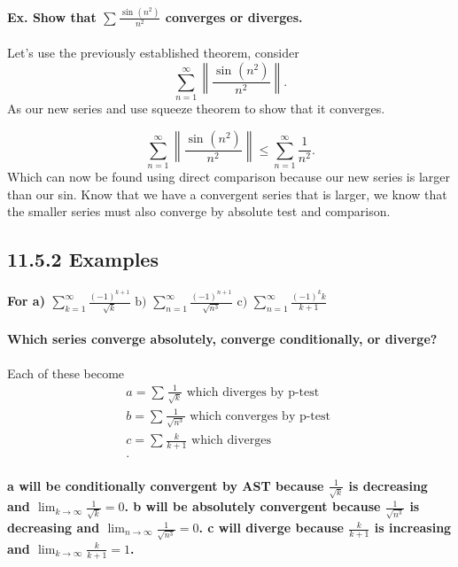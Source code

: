 \documentclass[a4paper]{article}
\begin{document}
\paragraph{Ex. Show that $ \sum_{  } ^{  } \frac{ \sin^{  } \left( n^2 \right)  }{ n^2 } $ converges or diverges.}
Let's use the previously established theorem, consider 
\[
\sum_{ n=1 } ^{ \infty } \left\| \frac{ \sin^{  } \left( n^2 \right)  }{ n^2 } \right\|
.\] As our new series and use squeeze theorem to show that it converges.

\[
\sum_{ n=1 } ^{ \infty } \left\| \frac{ \sin^{  } \left( n^2 \right)  }{ n^2 } \right\| \le \sum_{ n=1 } ^{ \infty } \frac{ 1 }{ n^2 } 
.\] 
Which can now be found using direct comparison because our new series is larger than our sin. Know that we have a convergent series that is larger, we know that the smaller series must also converge by absolute test and comparison. 
\subsection*{11.5.2 Examples}%
\label{sub:11.5.2 Examples}

\paragraph{For a) $ \sum_{ k=1 } ^{ \infty } \frac{ \left( -1 \right) ^{ k+1 } }{ \sqrt{ k} } \text{ b)  }\sum_{ n=1 } ^{ \infty } \frac{ \left( -1 \right) ^{ n+1 } }{ \sqrt{ n^3} } \text{ c)  } \sum_{ n=1 } ^{ \infty } \frac{ \left( -1 \right) ^{ k }k }{ k+1 } $ }
\paragraph{Which series converge absolutely, converge conditionally, or diverge?}
Each of these become
\begin{align*}
a = \sum_{  } ^{  } \frac{ 1 }{ \sqrt{ k} } \text{ which diverges by p-test } \\
b = \sum_{  } ^{  } \frac{ 1 }{ \sqrt{ n^3} } \text{ which converges by p-test } \\
c = \sum_{  } ^{  } \frac{ k }{ k+1 } \text{ which diverges } \\
.\end{align*}
\paragraph{a will be conditionally convergent by AST because $ \frac{ 1 }{ \sqrt{ k} } $ is decreasing and $ \lim_{ k \to \infty } \frac{ 1 }{ \sqrt{ k} } = 0 $. b will be absolutely convergent because $ \frac{ 1 }{ \sqrt{ n^3} } $ is decreasing and $ \lim_{ n \to \infty } \frac{ 1 }{ \sqrt{ n^3} } = 0 $. c will diverge because $ \frac{ k }{ k+1 } $ is increasing and $ \lim_{ k \to \infty } \frac{ k }{ k+1 } = 1 $.}
\end{document}

